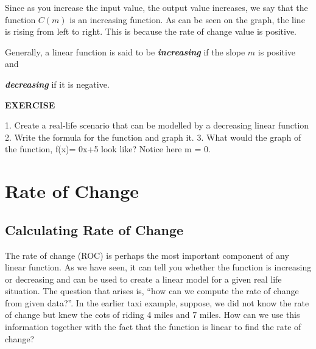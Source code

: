 \documentclass[
  letterpaper,
  DIV=11,
  numbers=noendperiod]{scrreprt}
\newenvironment{Shaded}{\begin{snugshade}}{\end{snugshade}}
\newcommand{\DataTypeTok}[1]{\textcolor[rgb]{0.68,0.00,0.00}{#1}}
\newcommand{\DecValTok}[1]{\textcolor[rgb]{0.68,0.00,0.00}{#1}}
\newcommand{\ErrorTok}[1]{\textcolor[rgb]{0.68,0.00,0.00}{#1}}
\newcommand{\KeywordTok}[1]{\textcolor[rgb]{0.00,0.23,0.31}{#1}}
\newcommand{\OperatorTok}[1]{\textcolor[rgb]{0.37,0.37,0.37}{#1}}
\begin{document}
Since as you increase the input value, the output value increases, we
say that the function \(C(m)\) is an increasing function. As can be seen
on the graph, the line is rising from left to right. This is because the
rate of change value is positive.

Generally, a linear function is said to be \textbf{\emph{increasing}} if
the slope \(m\) is positive and

\textbf{\emph{decreasing}} if it is negative.

\textbf{EXERCISE}

\begin{Shaded}
\begin{Highlighting}[]
\DataTypeTok{1}\KeywordTok{.} \DataTypeTok{Create} \DataTypeTok{a} \DataTypeTok{real{-}life} \DataTypeTok{scenario} \DataTypeTok{that} \DataTypeTok{can} \DataTypeTok{be} \DataTypeTok{modelled} \DataTypeTok{by} \DataTypeTok{a} \DataTypeTok{decreasing} \DataTypeTok{linear} \DataTypeTok{function}
\DataTypeTok{2}\KeywordTok{.} \DataTypeTok{Write} \DataTypeTok{the} \DataTypeTok{formula} \DataTypeTok{for} \DataTypeTok{the} \DataTypeTok{function} \DataTypeTok{and} \DataTypeTok{graph} \DataTypeTok{it}\KeywordTok{.}
\DataTypeTok{3}\KeywordTok{.} \DataTypeTok{What} \DataTypeTok{would} \DataTypeTok{the} \DataTypeTok{graph} \DataTypeTok{of} \DataTypeTok{the} \DataTypeTok{function}\ErrorTok{,} \DataTypeTok{f}\ErrorTok{(}\DataTypeTok{x}\ErrorTok{)}\OperatorTok{=} \DecValTok{0}\DataTypeTok{x}\ErrorTok{+}\DataTypeTok{5} \DataTypeTok{look} \DataTypeTok{like}\ErrorTok{?} \DataTypeTok{Notice} \DataTypeTok{here} \DataTypeTok{m} \OperatorTok{=} \DecValTok{0}\KeywordTok{.} 
\end{Highlighting}
\end{Shaded}

\hypertarget{rate-of-change}{%
\chapter{Rate of Change}\label{rate-of-change}}

\hypertarget{calculating-rate-of-change}{%
\section{Calculating Rate of Change}\label{calculating-rate-of-change}}

The rate of change (ROC) is perhaps the most important component of any
linear function. As we have seen, it can tell you whether the function
is increasing or decreasing and can be used to create a linear model for
a given real life situation. The question that arises is, ``how can we
compute the rate of change from given data?''. In the earlier taxi
example, suppose, we did not know the rate of change but knew the cots
of riding 4 miles and 7 miles. How can we use this information together
with the fact that the function is linear to find the rate of change?
\end{document}
